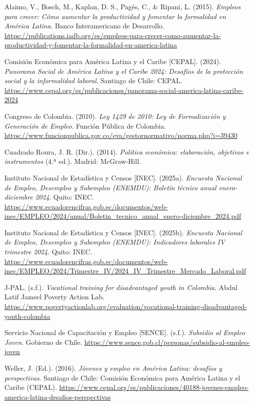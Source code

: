 \documentclass[10pt,]{article}
\newenvironment{referenciasAPA}{\setlength{\parindent}{-1.27cm}\setlength{\leftskip}{1.27cm}\setlength{\parskip}{6pt}}{\par}
\begin{document}
\begin{referenciasAPA}
Alaimo, V., Bosch, M., Kaplan, D. S., Pagés, C., \& Ripani, L. (2015). \textit{Empleos para crecer: Cómo aumentar la productividad y fomentar la formalidad en América Latina}. Banco Interamericano de Desarrollo. \url{https://publications.iadb.org/es/empleos-para-crecer-como-aumentar-la-productividad-y-fomentar-la-formalidad-en-america-latina}

Comisión Económica para América Latina y el Caribe [CEPAL]. (2024). \textit{Panorama Social de América Latina y el Caribe 2024: Desafíos de la protección social y la informalidad laboral}. Santiago de Chile: CEPAL. \url{https://www.cepal.org/es/publicaciones/panorama-social-america-latina-caribe-2024}

Congreso de Colombia. (2010). \textit{Ley 1429 de 2010: Ley de Formalización y Generación de Empleo}. Función Pública de Colombia. \url{https://www.funcionpublica.gov.co/eva/gestornormativo/norma.php?i=39430}

Cuadrado Roura, J. R. (Dir.). (2014). \textit{Política económica: elaboración, objetivos e instrumentos} (4.ª ed.). Madrid: McGraw-Hill.

Instituto Nacional de Estadística y Censos [INEC]. (2025a). \textit{Encuesta Nacional de Empleo, Desempleo y Subempleo (ENEMDU): Boletín técnico anual enero-diciembre 2024}. Quito: INEC. \url{https://www.ecuadorencifras.gob.ec/documentos/web-inec/EMPLEO/2024/anual/Boletin_tecnico_anual_enero-diciembre_2024.pdf}

Instituto Nacional de Estadística y Censos [INEC]. (2025b). \textit{Encuesta Nacional de Empleo, Desempleo y Subempleo (ENEMDU): Indicadores laborales IV trimestre 2024}. Quito: INEC. \url{https://www.ecuadorencifras.gob.ec/documentos/web-inec/EMPLEO/2024/Trimestre_IV/2024_IV_Trimestre_Mercado_Laboral.pdf}

J-PAL. (s.f.). \textit{Vocational training for disadvantaged youth in Colombia}. Abdul Latif Jameel Poverty Action Lab. \url{https://www.povertyactionlab.org/evaluation/vocational-training-disadvantaged-youth-colombia}

Servicio Nacional de Capacitación y Empleo [SENCE]. (s.f.). \textit{Subsidio al Empleo Joven}. Gobierno de Chile. \url{https://www.sence.gob.cl/personas/subsidio-al-empleo-joven}

Weller, J. (Ed.). (2016). \textit{Jóvenes y empleo en América Latina: desafíos y perspectivas}. Santiago de Chile: Comisión Económica para América Latina y el Caribe (CEPAL). \url{https://www.cepal.org/es/publicaciones/40188-jovenes-empleo-america-latina-desafios-perspectivas}
\end{referenciasAPA}
\end{document}
